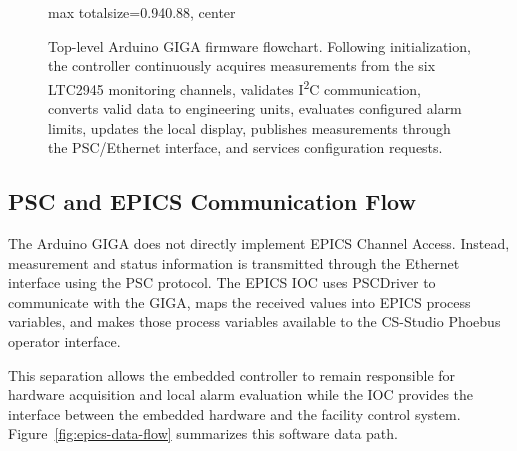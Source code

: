 \begin{figure}[H]
\begin{adjustbox}{
            max totalsize={0.94\textwidth}{0.88\textheight},
            center
        }

    \end{adjustbox}

    \caption{
        Top-level Arduino GIGA firmware flowchart. Following initialization,
        the controller continuously acquires measurements from the six LTC2945
        monitoring channels, validates I\textsuperscript{2}C communication,
        converts valid data to engineering units, evaluates configured alarm
        limits, updates the local display, publishes measurements through the
        PSC/Ethernet interface, and services configuration requests.
    }
    \label{fig:firmware-flowchart}

\end{figure}


\subsection{PSC and EPICS Communication Flow}
\label{sec:epics-software-flowchart}

The Arduino GIGA does not directly implement EPICS Channel Access. Instead,
measurement and status information is transmitted through the Ethernet
interface using the PSC protocol. The EPICS IOC uses PSCDriver to communicate
with the GIGA, maps the received values into EPICS process variables, and makes
those process variables available to the CS-Studio Phoebus operator interface.

This separation allows the embedded controller to remain responsible for
hardware acquisition and local alarm evaluation while the IOC provides the
interface between the embedded hardware and the facility control system.
Figure~\ref{fig:epics-data-flow} summarizes this software data path.

